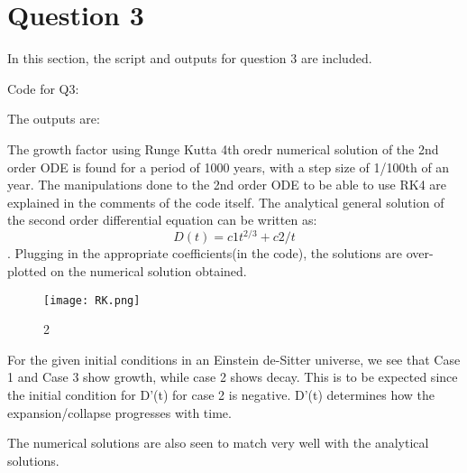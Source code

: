 \section{Question 3}

In this section, the script and outputs for question 3 are included.

Code for Q3:


The outputs are:


The growth factor using Runge Kutta 4th oredr numerical solution of the 2nd order ODE is found for a period of 1000 years, with a step size of 1/100th of an year.
The manipulations done to the 2nd order ODE to be able to use RK4 are explained in the comments of the code itself. 
The analytical general solution of the second order differential equation can be written as:$$ D(t) = c1t^{2/3} + c2/t$$. Plugging in the appropriate coefficients(in the code), the solutions are over-plotted on the numerical solution obtained. 

\begin{figure}[h!]
  \centering
  \texttt{[image: RK.png]}
  \caption{2}
  \label{fig:fig1}
\end{figure}

For the given initial conditions in an Einstein de-Sitter universe, we see that Case 1 and Case 3 show growth, while case 2 shows decay. This is to be expected since the initial condition for D'(t) for case 2 is negative. D'(t) determines how the expansion/collapse progresses with time.

The numerical solutions are also seen to match very well with the analytical solutions.